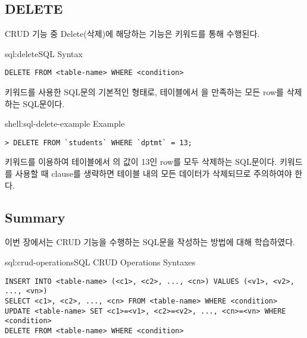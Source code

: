 \subsection*{DELETE}

CRUD 기능 중 Delete(삭제)에 해당하는 기능은  키워드를 통해 수행된다.

\begin{sql}{sql:delete}{SQL  Syntax}
\begin{verbatim}
DELETE FROM <table-name> WHERE <condition>
\end{verbatim}
\end{sql}

\는  키워드를 사용한 SQL문의 기본적인 형태로,  테이블에서 을 만족하는 모든 row를 삭제하는 SQL문이다.

\begin{shell}{shell:sql-delete-example}{ Example}
\begin{verbatim}
> DELETE FROM `students` WHERE `dptmt` = 13;
\end{verbatim}
\end{shell}

\은  키워드를 이용하여  테이블에서 의 값이 13인 row를 모두 삭제하는 SQL문이다.  키워드를 사용할 때  clause를 생략하면 테이블 내의 모든 데이터가 삭제되므로 주의하여야 한다.

\subsection*{Summary}

이번 장에서는 CRUD 기능을 수행하는 SQL문을 작성하는 방법에 대해 학습하였다.

\begin{sql}{sql:crud-operations}{SQL CRUD Operations Syntaxes}
\begin{verbatim}
INSERT INTO <table-name> (<c1>, <c2>, ..., <cn>) VALUES (<v1>, <v2>, ..., <vn>)
SELECT <c1>, <c2>, ..., <cn> FROM <table-name> WHERE <condition>
UPDATE <table-name> SET <c1>=<v1>, <c2>=<v2>, ..., <cn>=<vn> WHERE <condition>
DELETE FROM <table-name> WHERE <condition>
\end{verbatim}
\end{sql}
